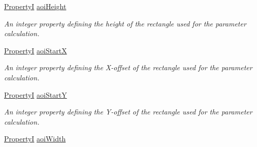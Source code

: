\begin{DoxyCompactItemize}
\item 
\hypertarget{classmv_i_m_p_a_c_t_1_1acquire_1_1_auto_control_parameters_ac1e243aa47ec29b152ede3cce7c41a9f}{\hyperlink{group___common_interface_ga12d5e434238ca242a1ba4c6c3ea45780}{Property\+I} \hyperlink{classmv_i_m_p_a_c_t_1_1acquire_1_1_auto_control_parameters_ac1e243aa47ec29b152ede3cce7c41a9f}{aoi\+Height}}\label{classmv_i_m_p_a_c_t_1_1acquire_1_1_auto_control_parameters_ac1e243aa47ec29b152ede3cce7c41a9f}

\begin{DoxyCompactList}\small\item\em An integer property defining the height of the rectangle used for the parameter calculation. \end{DoxyCompactList}\item 
\hyperlink{group___common_interface_ga12d5e434238ca242a1ba4c6c3ea45780}{Property\+I} \hyperlink{classmv_i_m_p_a_c_t_1_1acquire_1_1_auto_control_parameters_a1149e8b2769f11e35c60a64112570706}{aoi\+Start\+X}
\begin{DoxyCompactList}\small\item\em An integer property defining the X-\/offset of the rectangle used for the parameter calculation. \end{DoxyCompactList}\item 
\hyperlink{group___common_interface_ga12d5e434238ca242a1ba4c6c3ea45780}{Property\+I} \hyperlink{classmv_i_m_p_a_c_t_1_1acquire_1_1_auto_control_parameters_a58ded333b56e13a9924c20162556502c}{aoi\+Start\+Y}
\begin{DoxyCompactList}\small\item\em An integer property defining the Y-\/offset of the rectangle used for the parameter calculation. \end{DoxyCompactList}\item 
\hypertarget{classmv_i_m_p_a_c_t_1_1acquire_1_1_auto_control_parameters_ac02ddc06be02284eb0f4361b2c5da019}{\hyperlink{group___common_interface_ga12d5e434238ca242a1ba4c6c3ea45780}{Property\+I} \hyperlink{classmv_i_m_p_a_c_t_1_1acquire_1_1_auto_control_parameters_ac02ddc06be02284eb0f4361b2c5da019}{aoi\+Width}}\label{classmv_i_m_p_a_c_t_1_1acquire_1_1_auto_control_parameters_ac02ddc06be02284eb0f4361b2c5da019}


\end{DoxyCompactItemize}
